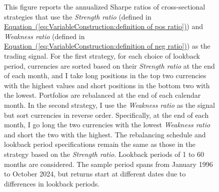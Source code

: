 \documentclass[12pt,oneside,letter]{article}
\newcommand*{\myeq}[1]{\hyperref[{#1}]{Equation~(\ref*{#1})}}
\begin{document}
\begin{landscape}
\begin{figure}
	
	    \begin{small}
	    This figure reports the annualized Sharpe ratios of cross-sectional strategies that use the \textit{Strength ratio} (defined in \myeq{eq:VariableConstruction:definition of pos ratio}) and \textit{Weakness ratio} (defined in \myeq{eq:VariableConstruction:definition of neg ratio}) as the trading signal. For the first strategy, for each choice of lookback period, currencies are sorted based on their \textit{Strength ratio} at the end of each month, and I take long positions in the top two currencies with the highest values and short positions in the bottom two with the lowest. Portfolios are rebalanced at the end of each calendar month. In the second strategy, I use the \textit{Weakness ratio} as the signal but sort currencies in reverse order. Specifically, at the end of each month, I go long the two currencies with the lowest \textit{Weakness ratio} and short the two with the highest. The rebalancing schedule and lookback period specifications remain the same as those in the strategy based on the \textit{Strength ratio}. Lookback periods of 1 to 60 months are considered. The sample period spans from January 1996 to October 2024, but returns start at different dates due to differences in lookback periods.
	    \end{small}
	    
	\end{figure}

\end{landscape}
\end{document}

